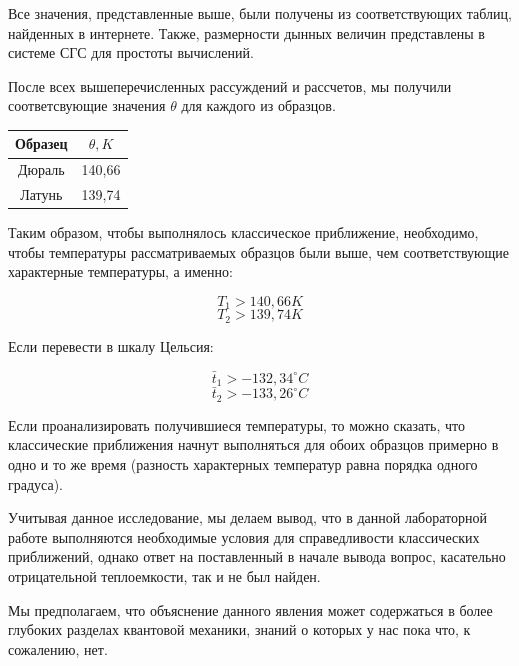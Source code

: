 \documentclass[a4paper,12pt]{article}
\begin{document}
Все значения, представленные выше, были получены из соответствующих таблиц, найденных в интернете. Также, размерности дынных величин представлены в системе СГС для простоты вычислений.

После всех вышеперечисленных рассуждений и рассчетов, мы получили соответсвующие значения $\theta$ для каждого из образцов.

\begin{center}
		\begin{tabular}{|c|c|}
			
			\hline
			Образец&	$\theta, K$
			\\
			\hline
			Дюраль&	140,66
			\\
			Латунь&	139,74
			\\
			\hline		
			
		\end{tabular}
\end{center}

Таким образом, чтобы выполнялось классическое приближение, необходимо, чтобы температуры рассматриваемых образцов были выше, чем соответствующие характерные температуры, а именно:

$$T_1 > 140,66K$$
$$T_2 > 139,74K$$

Если перевести в шкалу Цельсия:

$$\bar t_1 > -132,34^\circ C$$
$$\bar t_2 > -133,26^\circ C$$

Если проанализировать получившиеся температуры, то можно сказать, что классические приближения начнут выполняться для обоих образцов примерно в одно и то же время (разность характерных температур равна порядка одного градуса).

Учитывая данное исследование, мы делаем вывод, что в данной лабораторной работе выполняются необходимые условия для справедливости классических приближений, однако ответ на поставленный в начале вывода вопрос, касательно отрицательной теплоемкости, так и не был найден.

Мы предполагаем, что объяснение данного явления может содержаться в более глубоких разделах квантовой механики, знаний о которых у нас пока что, к сожалению, нет.
\end{document}
